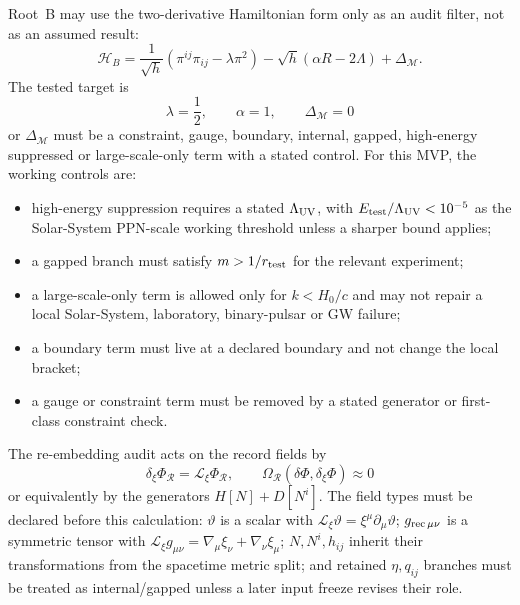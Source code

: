 \documentclass[11pt]{article}
\begin{document}
Root~B may use the two-derivative Hamiltonian form only as an audit filter,
not as an assumed result:
\[
\boxed{
\mathcal H_B=
\frac{1}{\sqrt h}\left(\pi^{ij}\pi_{ij}-\lambda\pi^2\right)
-\sqrt h(\alpha R-2\Lambda)+\Delta_{\mathcal M}.
}
\]
The tested target is
\[
\boxed{\lambda=\frac12,\qquad \alpha=1,\qquad \Delta_{\mathcal M}=0}
\]
or \(\Delta_{\mathcal M}\) must be a constraint, gauge, boundary, internal,
gapped, high-energy suppressed or large-scale-only term with a stated control.
For this MVP, the working controls are:
\begin{itemize}
\item high-energy suppression requires a stated \(\Lambda_{\rm UV}\), with
  \(E_{\rm test}/\Lambda_{\rm UV}<10^{-5}\) as the Solar-System PPN-scale
  working threshold unless a sharper bound applies;
\item a gapped branch must satisfy \(m>1/r_{\rm test}\) for the relevant
  experiment;
\item a large-scale-only term is allowed only for \(k<H_0/c\) and may not
  repair a local Solar-System, laboratory, binary-pulsar or GW failure;
\item a boundary term must live at a declared boundary and not change the
  local bracket;
\item a gauge or constraint term must be removed by a stated generator or
  first-class constraint check.
\end{itemize}

The re-embedding audit acts on the record fields by
\[
\boxed{\delta_\xi\Phi_{\mathcal R}=\mathcal L_\xi\Phi_{\mathcal R}},
\qquad
\boxed{\Omega_{\mathcal R}(\delta\Phi,\delta_\xi\Phi)\approx0}
\]
or equivalently by the generators \(H[N]+D[N^i]\).  The field types must be
declared before this calculation: \(\vartheta\) is a scalar with
\(\mathcal L_\xi\vartheta=\xi^\mu\partial_\mu\vartheta\);
\(g_{\rm rec\,\mu\nu}\) is a symmetric tensor with
\(\mathcal L_\xi g_{\mu\nu}=\nabla_\mu\xi_\nu+\nabla_\nu\xi_\mu\);
\(N,N^i,h_{ij}\) inherit their transformations from the spacetime metric
split; and retained \(\eta,q_{ij}\) branches must be treated as
internal/gapped unless a later input freeze revises their role.
\end{document}
